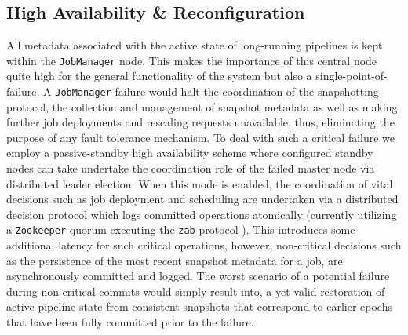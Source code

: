 
\subsection{High Availability \& Reconfiguration}

All metadata associated with the active state of long-running pipelines is kept within the \texttt{JobManager} node. This makes the importance of this central node quite high for the general functionality of the system but also a single-point-of-failure. A \texttt{JobManager} failure would halt the coordination of the snapshotting protocol, the collection and management of snapshot metadata as well as making further job deployments and rescaling requests unavailable, thus, eliminating the purpose of any fault tolerance mechanism. To deal with such a critical failure we employ a passive-standby high availability scheme where configured standby nodes can take undertake the coordination role of the failed master node via distributed leader election. When this mode is enabled, the coordination of vital decisions such as job deployment and scheduling are undertaken via a distributed decision protocol which logs committed operations atomically (currently utilizing a \texttt{Zookeeper} quorum executing the \texttt{zab} protocol \cite{hunt2010zookeeper}). This introduces some additional latency for such critical operations, however, non-critical decisions such as the persistence of the most recent snapshot metadata for a job, are asynchronously committed and logged. The worst scenario of a potential failure during non-critical commits would simply result into, a yet valid restoration of active pipeline state from consistent snapshots that correspond to earlier epochs that have been fully committed prior to the failure.

	